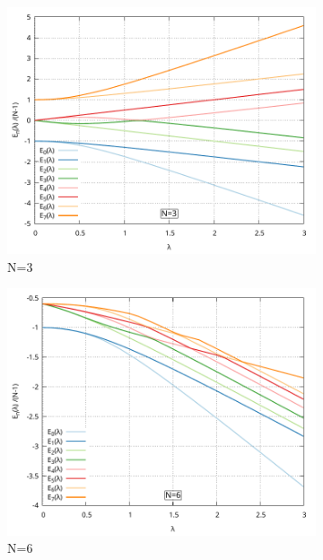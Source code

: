 \documentclass[11pt,a4paper]{article}
\begin{document}
\begin{figure}
	\centering
	\begin{subfigure}{0.49\textwidth}
		\includegraphics[width=1\linewidth]{Plots/EigVals_N03.pdf}
		\caption{N=3}
		\label{fig:N3}
	\end{subfigure}%
	\hfill
	\begin{subfigure}{0.49\textwidth}
		\includegraphics[width=1\linewidth]{Plots/EigVals_N06.pdf}
		\caption{N=6}
		\label{fig:N6}
	\end{subfigure}
	\begin{subfigure}{0.49\textwidth}

\end{subfigure}
\end{figure}
\end{document}
